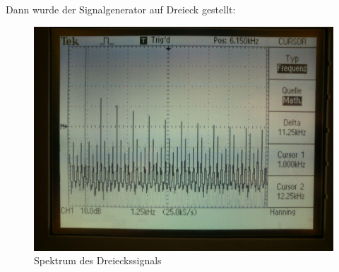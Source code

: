 Dann wurde der Signalgenerator auf Dreieck gestellt:
\begin{figure}[H]
	\centering
	\includegraphics[width=\linewidth]{versuch4/oszi/DSC_0431.JPG}
	\caption{Spektrum des Dreieckssignals}
\end{figure}


